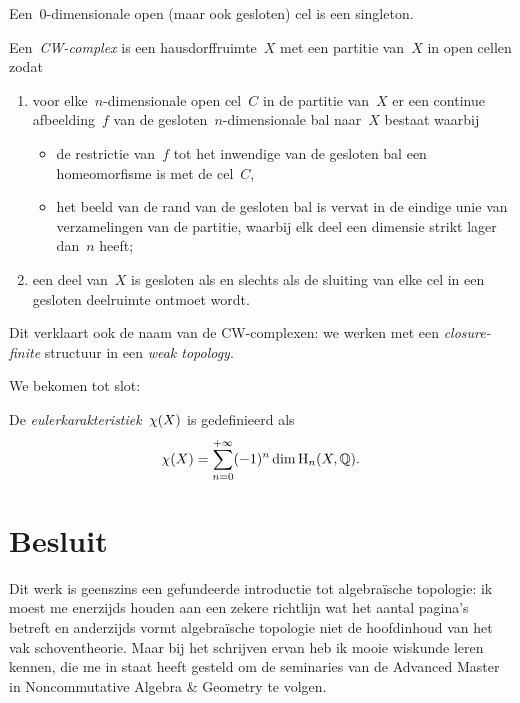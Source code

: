 \documentclass[a4paper,11pt,openany,oneside,article]{memoir}
\begin{document}
\begin{remark}
  Een~$0$\nobreakdash-dimensionale open (maar ook gesloten) cel is een singleton.
\end{remark}

\begin{definition}
  Een~\emph{CW\nobreakdash-complex} is een hausdorffruimte~$X$ met een partitie van~$X$ in open cellen zodat
  \begin{enumerate}
    \item voor elke~$n$\nobreakdash-dimensionale open cel~$C$ in de partitie van~$X$ er een continue afbeelding~$f$ van de gesloten~$n$\nobreakdash-dimensionale bal naar~$X$ bestaat waarbij
      \begin{itemize}
        \item de restrictie van~$f$ tot het inwendige van de gesloten bal een homeomorfisme is met de cel~$C$,
        \item het beeld van de rand van de gesloten bal is vervat in de eindige unie van verzamelingen van de partitie, waarbij elk deel een dimensie strikt lager dan~$n$ heeft;
      \end{itemize}
    \item een deel van~$X$ is gesloten als en slechts als de sluiting van elke cel in een gesloten deelruimte ontmoet wordt.
  \end{enumerate}
\end{definition}

Dit verklaart ook de naam van de CW\nobreakdash-complexen: we werken met een \emph{closure-finite} structuur in een \emph{weak topology}.

We bekomen tot slot:

\begin{definition}
  De \emph{eulerkarakteristiek}~$\chi(X)$ is gedefinieerd als
  \begin{equation}
    \chi(X)=\sum_{n=0}^{+\infty}(-1)^n\dim\mathrm{H}_n(X,\mathbb{Q}).
  \end{equation}
\end{definition}

\clearpage

\section{Besluit}
Dit werk is geenszins een gefundeerde introductie tot algebra\"ische topologie: ik moest me enerzijds houden aan een zekere richtlijn wat het aantal pagina's betreft en anderzijds vormt algebra\"ische topologie niet de hoofdinhoud van het vak schoventheorie. Maar bij het schrijven ervan heb ik mooie wiskunde leren kennen, die me in staat heeft gesteld om de seminaries van de Advanced Master in Noncommutative Algebra \& Geometry te volgen.

\nocite{*}


\end{document}
